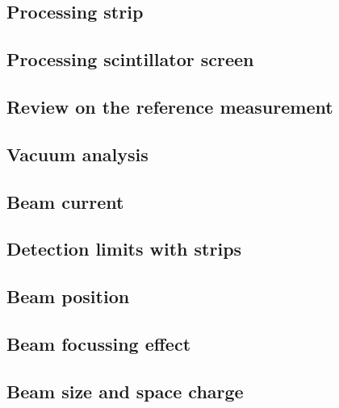 \begin{refsection}
  

  \subsection{Processing strip}


  \cite{Brun1997,Antcheva2009}
  \subsection{Processing scintillator screen}

  \subsection{Review on the reference measurement}
  
  \subsection{Vacuum analysis}
  \label{sec4:vacuum}
  

  \subsection{Beam current}
  
  
  
  \subsection{Detection limits with strips}

  \subsection{Beam position}

  
  \subsection{Beam focussing effect}

  \subsection{Beam size and space charge}


\end{refsection}
